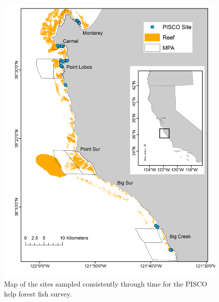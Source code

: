 \documentclass[12pt,]{article}
\begin{document}
\FloatBarrier

\begin{figure}
\centering
\includegraphics{Figures/PISCO_sites.png}
\caption{Map of the sites sampled consistently through time for the
PISCO kelp forest fish survey. \label{fig:PISCO_sites}}
\end{figure}

\FloatBarrier
\end{document}
